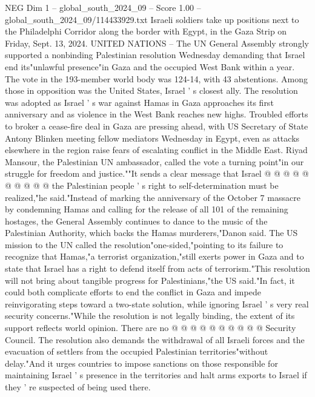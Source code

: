 \begin{textsample}{NEG Dim 1 – global\_south\_2024\_09 – Score 1.00 – global\_south\_2024\_09/114433929.txt}  \label{ex:f1_neg_241}
Israeli soldiers take up positions next to the Philadelphi Corridor along the border with Egypt, in the Gaza Strip on Friday, Sept. 13, 2024.
UNITED NATIONS -- The UN General Assembly strongly supported a nonbinding Palestinian resolution Wednesday demanding that Israel end its"unlawful presence"in Gaza and the occupied West Bank within a year.
The vote in the 193-member world body was 124-14, with 43 abstentions.
Among those in opposition was the United States, Israel ' s closest ally.
The resolution was adopted as Israel ' s war against Hamas in Gaza approaches its first anniversary and as violence in the West Bank reaches new highs.
Troubled efforts to broker a cease-fire deal in Gaza are pressing ahead, with US Secretary of State Antony Blinken meeting fellow mediators Wednesday in Egypt, even as attacks elsewhere in the region raise fears of escalating conflict in the Middle East.
Riyad Mansour, the Palestinian UN ambassador, called the vote a turning point"in our struggle for freedom and justice.""It sends a clear message that Israel @ @ @ @ @ @ @ @ @ @ the Palestinian people ' s right to self-determination must be realized,"he said."Instead of marking the anniversary of the October 7 massacre by condemning Hamas and calling for the release of all 101 of the remaining hostages, the General Assembly continues to dance to the music of the Palestinian Authority, which backs the Hamas murderers,"Danon said.
The US mission to the UN called the resolution"one-sided,"pointing to its failure to recognize that Hamas,"a terrorist organization,"still exerts power in Gaza and to state that Israel has a right to defend itself from acts of terrorism."This resolution will not bring about tangible progress for Palestinians,"the US said."In fact, it could both complicate efforts to end the conflict in Gaza and impede reinvigorating steps toward a two-state solution, while ignoring Israel ' s very real security concerns."While the resolution is not legally binding, the extent of its support reflects world opinion.
There are no @ @ @ @ @ @ @ @ @ @ Security Council.
The resolution also demands the withdrawal of all Israeli forces and the evacuation of settlers from the occupied Palestinian territories"without delay."And it urges countries to impose sanctions on those responsible for maintaining Israel ' s presence in the territories and halt arms exports to Israel if they ' re suspected of being used there.

\end{textsample}
